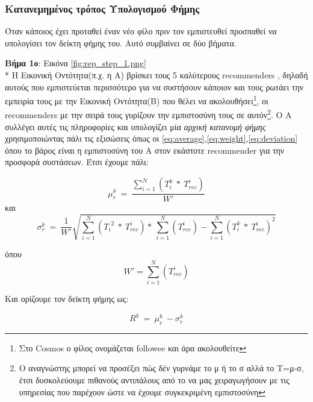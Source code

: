 \subsubsection{Κατανεμημένος τρόπος Υπολογισμού Φήμης}
Όταν κάποιος έχει προταθεί έναν νέο φίλο πριν τον εμπιστευθεί προσπαθεί να υπολογίσει τον δείκτη φήμης του. Αυτό συμβαίνει σε δύο βήματα.

\textbf{Βήμα 1ο}: Εικόνα \ref{fig:rep_step_1.png} \\*
Η Εικονική Οντότητα(π.χ. η Α) βρίσκει τους 5 καλύτερους recommenders , δηλαδή αυτούς που εμπιστεύεται περισσότερο για να συστήσουν κάποιον και τους ρωτάει την εμπειρία τους με την Εικονική Οντότητα(Β) που θέλει να ακολουθήσει\footnote{Στο Cosmos ο φίλος ονομάζεται followee και άρα ακολουθείτε}, οι recommenders  με την σειρά τους γυρίζουν την εμπιστοσύνη τους σε αυτόν\footnote{Ο αναγνώστης μπορεί να προσέξει πώς δέν γυρνάμε το μ ή το σ αλλά το Τ=μ-σ, έτσι δυσκολεύουμε πιθανούς αντιπάλους από το να μας χειραγωγήσουν με τις υπηρεσίας που παρέχουν ώστε να έχουμε συγκεκριμένη εμπιστοσύνη}. Ο Α συλλέγει αυτές τις πληροφορίες και υπολογίζει μία \textit{ αρχική κατανομή φήμης } χρησιμοποιώντας πάλι τις εξισώσεις όπως οι \ref{eq:average},\ref{eq:weight},\ref{eq:deviation} όπου το βάρος είναι η εμπιστοσύνη του Α στον εκάστοτε recommender για την προσφορά συστάσεων. Έτσι έχουμε πάλι:

\begin{equation}\label{eq:rep_average}
 \mu_r^k\  =\ \frac{\sum_{i=1}^{N}\left( T_i^k\ *\ T_{rec}^i \right)}{W'} 
\end{equation}
και
\begin{equation}\label{eq:rep_deviation}
 \sigma_r^k\  =\ \frac{1}{W'} \sqrt{\sum_{i=1}^{N}\left( {T_i}^2\ *\ T_{rec}^i \right)* \ \sum_{i=1}^{N} \left(T_{rec}^i\right)- \sum_{i=1}^{N}\left( T_i^k\ *\ T_{rec}^i \right)^2}
\end{equation}

όπου 
\begin{equation}\label{eq:rep_weight}
 W' = \sum_{i=1}^{N}\left( T_{rec}^i \right)
\end{equation}

Και ορίζουμε τον δείκτη φήμης ως:

\begin{equation}\label{eq:reputation}
 R^k \ = \ \mu_r^k \ - \sigma_r^k 
\end{equation}



